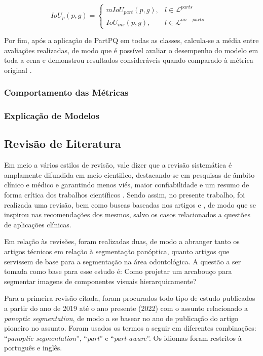 \begin{equation}
\label{proposal:avaliation:eq:2}
    IoU_p(p,g)= \left\{\begin{matrix}
        mIoU_{part}(p,g), & l \in \mathcal{L}^{parts}    & \\ 
        IoU_{ins}(p,g),        & l \in \mathcal{L}^{no-parts} & 
    \end{matrix}\right.
\end{equation}

Por fim, após a aplicação de PartPQ em todas as classes, calcula-se a média entre avaliações realizadas, de modo que é possível avaliar o desempenho do modelo em toda a cena e demonstrou resultados consideráveis quando comparado à métrica original \cite{DeGeus2021}.

\subsubsection{Comportamento das Métricas}

\subsubsection{Explicação de Modelos}


\subsection{Revisão de Literatura}
\label{proposal:revision}
Em meio a vários estilos de revisão, vale dizer que a revisão sistemática é amplamente difundida em meio cientifico, destacando-se em pesquisas de âmbito clínico e médico e garantindo menos viés, maior confiabilidade e um resumo de forma crítica dos trabalhos científicos \cite{barbosa2019}. Sendo assim, no presente trabalho, foi realizada uma revisão, bem como buscas baseadas nos artigos \cite{barbosa2019} e \cite{liberati2009}, de modo que se inspirou nas recomendações dos mesmos, salvo os casos relacionados a questões de aplicações clínicas.

Em relação às revisões, foram realizadas duas, de modo a abranger tanto os artigos técnicos em relação à segmentação panóptica, quanto artigos que servissem de base para a segmentação na área odontológica. A questão a ser tomada como base para esse estudo é: Como projetar um arcabouço para segmentar imagens de componentes visuais hierarquicamente?

Para a primeira revisão citada, foram procurados todo tipo de estudo publicados a partir do ano de 2019 até o ano presente (2022) com o assunto relacionado a \textit{panoptic segmentation}, de modo a se basear no ano de publicação do artigo pioneiro \cite{Kirillov2019a} no assunto. Foram usados os termos a seguir em diferentes combinações: ``\textit{panoptic segmentation}'', ``\textit{part}'' e ``\textit{part-aware}''. Os idiomas foram restritos à português e inglês.

